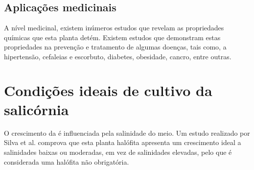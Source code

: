 

\subsection{Aplicações medicinais}


A nível medicinal, existem inúmeros estudos que revelam as propriedades químicas que esta planta detém. Existem estudos que demonstram estas propriedades na prevenção e tratamento de algumas doenças, tais como, a hipertensão, cefaleias e escorbuto, diabetes, obesidade, cancro, entre outras.


\section{Condições ideais de cultivo da salicórnia}

O crescimento da \sr é influenciada pela salinidade do meio. Um estudo realizado por Silva et al.\cite{Silva2007} comprova que esta planta halófita apresenta um crescimento ideal a salinidades baixas ou moderadas, em vez de salinidades elevadas, pelo que é considerada uma halófita não obrigatória.













